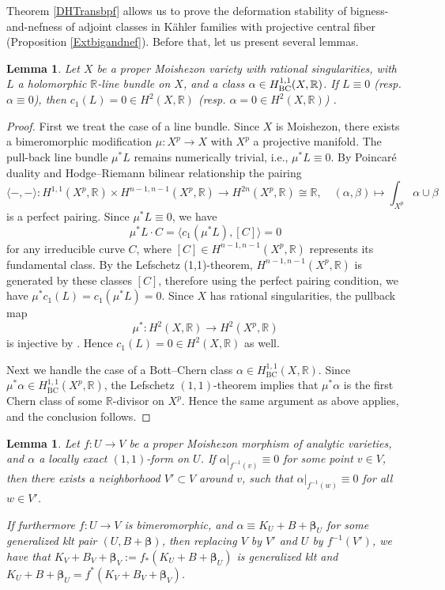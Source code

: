\documentclass[12pt]{amsart}
\numberwithin{equation}{section}
\newtheorem{lemma}  [theorem]     {Lemma}
\theoremstyle{definition}
\theoremstyle{plain}
\newtheorem*{thm A*}{Theorem A}
\newtheorem*{thm B*}{Theorem B}
\newtheorem*{thm C*}{Theorem C}
\newtheorem*{thm D*}{Theorem D}
\theoremstyle{definition}
\renewcommand{\1}{\mathds{1}}
\newcommand{\bbeta}{\boldsymbol{\beta}}
\renewcommand{\>}{\rightarrow}
\newcommand{\R}{\mathbb R}
\begin{document}
Theorem \ref{DHTransbpf} allows us to prove the deformation stability of bigness-and-nefness of adjoint classes in K\"ahler families with projective central fiber (Proposition \ref{Extbigandnef}). Before that, let us present several lemmas.
\begin{lemma}\label{Lemma: cohomologicaltrivial}
Let $X$ be a proper Moishezon variety with rational singularities, with $L$ a holomorphic $\mathbb{R}$-line bundle on $X$, and a class $\alpha \in H^{1,1}_{\rm{BC}}(X, \mathbb{R})$. If $L\equiv 0$ (resp. $\alpha \equiv 0$), then $c_1(L) = 0 \in H^2(X ,\mathbb{R})$ (resp. $\alpha  =0 \in H^2(X, \mathbb{R})$) . 
\end{lemma}
\begin{proof}
First we treat the case of a line bundle. Since $X$ is Moishezon, there exists a bimeromorphic modification $\mu : X^{p} \to X$ with $X^{p}$ a projective manifold. The pull-back line bundle $\mu^{*}L$ remains numerically trivial, i.e., $\mu^{*}L \equiv 0$. By Poincar\'e duality and Hodge--Riemann bilinear relationship the pairing $${\langle -,-\rangle}:H^{1,1}(X^p,\R)\times H^{n-1,n-1}(X^p,\R) \to H^{2 n}(X^p, \mathbb{R})\cong\R,\quad (\alpha, \beta)\mapsto \int_{X^p} \alpha \cup \beta$$is a perfect pairing. Since $\mu^* L \equiv 0$, we have $$\mu^* L \cdot C = {\langle c_1(\mu^* L), [ C]\rangle}= 0$$for any irreducible curve $C$, where $[C]\in H^{n-1,n-1}(X^p, \R)$ represents its fundamental class. By the Lefschetz (1,1)-theorem, $H^{n-1,n-1}(X^p,\R)$ is generated by these classes $[C]$, therefore using the perfect pairing condition, we have $\mu^* c_1(L) = c_1(\mu^* L) = 0$. Since $X$ has rational singularities, the pullback map
\[
\mu^{*} : H^{2}(X,\mathbb{R}) \to H^{2}(X^{p},\mathbb{R})
\]
is injective by \cite[Lemma~2.6]{DH24MMP}. Hence $c_{1}(L)=0 \in H^{2}(X,\mathbb{R})$ as well.

Next we handle the case of a Bott--Chern class $\alpha \in H^{1,1}_{\mathrm{BC}}(X,\mathbb{R})$. Since $\mu^{*}\alpha \in H^{1,1}_{\mathrm{BC}}(X^{p},\mathbb{R})$, the Lefschetz $(1,1)$-theorem implies that $\mu^{*}\alpha$ is the first Chern class of some $\mathbb R$-divisor on $X^{p}$. Hence the same argument as above applies, and the conclusion follows.
\end{proof}
\begin{lemma}\label{l-bir}
Let $f:U\to V$ be a proper Moishezon morphism of analytic varieties, and $\alpha$ a locally exact $(1,1)$-form on $U$. If $\alpha |_{f^{-1}(v)}\equiv 0$ for some point $v\in V$, then there exists a neighborhood $V'\subset V$ around $v$, such that $\alpha |_{f^{-1}(w)}\equiv 0$ for all $w\in V'$.

If furthermore $f:U\to V$ is bimeromorphic, and $\alpha \equiv K_U+B+\bbeta _U$ for some generalized klt pair $(U,B+\bbeta )$, then replacing $V$ by $V'$ and $U$ by $f^{-1}(V')$, we have that $
K_V+B_V+\bbeta _V:=f_*(K_U+B+\bbeta _U)$
is generalized klt and $K_U+B+\bbeta _U=f^*(K_V+B_V+\bbeta _V)$.
\end{lemma}
\end{document}
